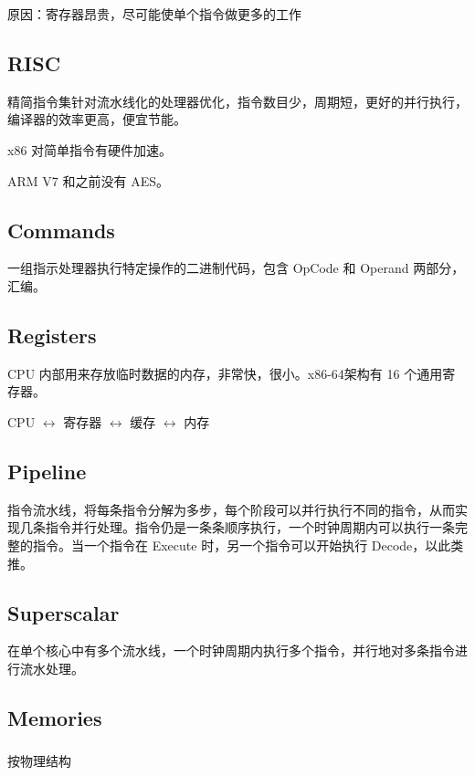 \documentclass[11pt,journal,compsoc]{IEEEtran}
\begin{document}
原因：寄存器昂贵，尽可能使单个指令做更多的工作


\subsection{RISC}

精简指令集针对流水线化的处理器优化，指令数目少，周期短，更好的并行执行，编译器的效率更高，便宜节能。

x86 对简单指令有硬件加速。

ARM V7 和之前没有 AES。


\subsection{Commands}

一组指示处理器执行特定操作的二进制代码，包含 OpCode 和 Operand 两部分，汇编。


\subsection{Registers}

CPU 内部用来存放临时数据的内存，非常快，很小。x86-64架构有 16 个通用寄存器。

CPU $\leftrightarrow$ 寄存器 $\leftrightarrow$ 缓存 $\leftrightarrow$ 内存


\subsection{Pipeline}

指令流水线，将每条指令分解为多步，每个阶段可以并行执行不同的指令，从而实现几条指令并行处理。指令仍是一条条顺序执行，一个时钟周期内可以执行一条完整的指令。当一个指令在 Execute 时，另一个指令可以开始执行 Decode，以此类推。


\subsection{Superscalar}

在单个核心中有多个流水线，一个时钟周期内执行多个指令，并行地对多条指令进行流水处理。


\subsection{Memories}


\subsubsection{}{按物理结构}
\end{document}
